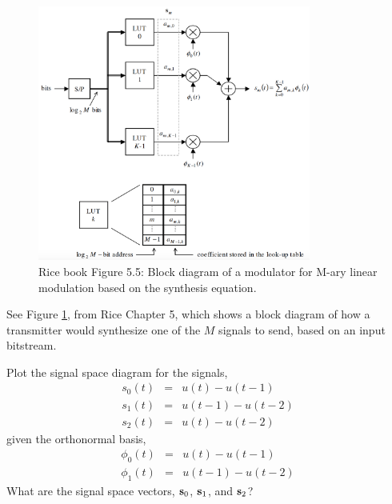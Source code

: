 \begin{figure}[htbp]
  \centerline{\includegraphics[width=0.8\textwidth]{RiceFigure5-5.png}
  }
  \caption{Rice book Figure 5.5: Block diagram of a modulator for M-ary linear modulation based on the synthesis
equation.}
  \label{F:SynthesisEquationFig}
\end{figure}

See Figure \ref{F:SynthesisEquationFig}, from Rice Chapter 5, which shows a block diagram of how a transmitter would synthesize one of the $M$ signals to send, based on an input bitstream.


 Plot the signal space diagram for
the signals,
\begin{eqnarray}
  s_0(t) &=& u(t) - u(t-1) \nonumber \\
  s_1(t) &=& u(t-1) - u(t-2) \nonumber \\
  s_2(t) &=& u(t) - u(t-2) \nonumber
\end{eqnarray}
given the orthonormal basis,
\begin{eqnarray}
  \phi_0(t) &=& u(t) - u(t-1) \nonumber \\
  \phi_1(t) &=& u(t-1) - u(t-2) \nonumber
\end{eqnarray}
What are the signal space vectors, $\mathbf{s}_0$, $\mathbf{s}_1$, and $\mathbf{s}_2$?


